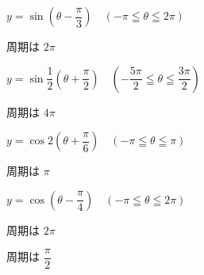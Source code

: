 \QQ
  {$y=\sin\left(\theta-\dfrac{\pi}{3}\right)\quad(-\pi\leqq\theta\leqq2\pi)$}
  {\begin{minipage}[t]{0.98\linewidth}%
     \vspace{0pt}%
     周期は $2\pi$
   \end{minipage}}
\QQ
  {$y=\sin\dfrac{1}{2}\left(\theta+\dfrac{\pi}{2}\right)\quad\left(-\dfrac{5\pi}{2}\leqq\theta\leqq\dfrac{3\pi}{2}\right)$}
  {\begin{minipage}[t]{0.98\linewidth}%
     \vspace{0pt}%
     周期は $4\pi$
   \end{minipage}}
\AnswerColumnBreak
\QQ
  {$y=\cos2\left(\theta+\dfrac{\pi}{6}\right)\quad(-\pi\leqq\theta\leqq\pi)$}
  {\begin{minipage}[t]{0.98\linewidth}%
     \vspace{0pt}%
     周期は $\pi$
   \end{minipage}}
\QQ
  {$y=\cos\left(\theta-\dfrac{\pi}{4}\right)\quad(-\pi\leqq\theta\leqq2\pi)$}
  {\begin{minipage}[t]{0.98\linewidth}%
     \vspace{0pt}%
     周期は $2\pi$
   \end{minipage}}
  {\begin{minipage}[t]{0.98\linewidth}%
     \vspace{0pt}%
     周期は $\dfrac{\pi}{2}$
   \end{minipage}}

